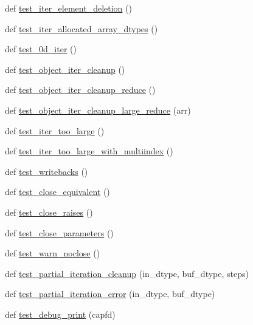 \begin{DoxyCompactItemize}
\item 
def \hyperlink{namespacenumpy_1_1core_1_1tests_1_1test__nditer_a6a2a318bbaddc8cc090b8a201ac59e89}{test\+\_\+iter\+\_\+element\+\_\+deletion} ()
\item 
def \hyperlink{namespacenumpy_1_1core_1_1tests_1_1test__nditer_a26c8e344f9d6b77e4a768dff2d71a39a}{test\+\_\+iter\+\_\+allocated\+\_\+array\+\_\+dtypes} ()
\item 
def \hyperlink{namespacenumpy_1_1core_1_1tests_1_1test__nditer_a6b39f03be8e5781fe234e31913454eae}{test\+\_\+0d\+\_\+iter} ()
\item 
def \hyperlink{namespacenumpy_1_1core_1_1tests_1_1test__nditer_a00d848de4625faf91e99d658a7eaea50}{test\+\_\+object\+\_\+iter\+\_\+cleanup} ()
\item 
def \hyperlink{namespacenumpy_1_1core_1_1tests_1_1test__nditer_ac87fdfe789b3479ccb224ced1335252b}{test\+\_\+object\+\_\+iter\+\_\+cleanup\+\_\+reduce} ()
\item 
def \hyperlink{namespacenumpy_1_1core_1_1tests_1_1test__nditer_a01632f91bbb5db47561417905fc3617b}{test\+\_\+object\+\_\+iter\+\_\+cleanup\+\_\+large\+\_\+reduce} (arr)
\item 
def \hyperlink{namespacenumpy_1_1core_1_1tests_1_1test__nditer_a11dcbbd470a0174c120228dda65da018}{test\+\_\+iter\+\_\+too\+\_\+large} ()
\item 
def \hyperlink{namespacenumpy_1_1core_1_1tests_1_1test__nditer_a47d560d564fa920eeaed8738855bac73}{test\+\_\+iter\+\_\+too\+\_\+large\+\_\+with\+\_\+multiindex} ()
\item 
def \hyperlink{namespacenumpy_1_1core_1_1tests_1_1test__nditer_a3acc7a08e9a4dd9f20d3f32f134bc598}{test\+\_\+writebacks} ()
\item 
def \hyperlink{namespacenumpy_1_1core_1_1tests_1_1test__nditer_a9db1a25e49fa3290218a6028f253f6b9}{test\+\_\+close\+\_\+equivalent} ()
\item 
def \hyperlink{namespacenumpy_1_1core_1_1tests_1_1test__nditer_ab550bac7fd7b10b6768b83980d3e8f7d}{test\+\_\+close\+\_\+raises} ()
\item 
def \hyperlink{namespacenumpy_1_1core_1_1tests_1_1test__nditer_aedbf37d5a63fcc12a62d76f6ec7ea918}{test\+\_\+close\+\_\+parameters} ()
\item 
def \hyperlink{namespacenumpy_1_1core_1_1tests_1_1test__nditer_a24510df827cb80ebed302c8c646e28bc}{test\+\_\+warn\+\_\+noclose} ()
\item 
def \hyperlink{namespacenumpy_1_1core_1_1tests_1_1test__nditer_a0a34240fcecc844d394855d0854aca67}{test\+\_\+partial\+\_\+iteration\+\_\+cleanup} (in\+\_\+dtype, buf\+\_\+dtype, steps)
\item 
def \hyperlink{namespacenumpy_1_1core_1_1tests_1_1test__nditer_a3de0a463191c8e53af956e85380349f6}{test\+\_\+partial\+\_\+iteration\+\_\+error} (in\+\_\+dtype, buf\+\_\+dtype)
\item 
def \hyperlink{namespacenumpy_1_1core_1_1tests_1_1test__nditer_a822f928547dcabf576f65980c4e34764}{test\+\_\+debug\+\_\+print} (capfd)
\end{DoxyCompactItemize}


